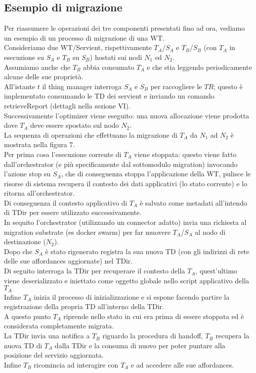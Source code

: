 \documentclass[11pt]{article}
\begin{document}
		\subsection{Esempio di migrazione}
		Per riassumere le operazioni dei tre componenti presentati fino ad ora, vediamo un esempio di un processo di migrazione di una WT. \\
		Consideriamo due WT/Servient, rispettivamente $T_A$/$S_A$ e $T_B$/$S_B$ (con $T_A$ in esecuzione su $S_A$ e $T_B$ su $S_B$) hostati sui nodi $N_1$ ed $N_2$. \\
		Assumiamo anche che $T_B$ abbia consumato $T_A$ e che stia leggendo periodicamente alcune delle sue proprietà. \\
		All'istante $t$ il thing manager interroga $S_A$ e $S_B$ per raccogliere le $TR$; questo è implementato consumando le TD dei servient e inviando un comando retrieveReport (dettagli nella sezione VI). \\
		Successivamente l'optimizer viene eseguito: una nuova allocazione viene prodotta dove $T_A$ deve essere spostato sul nodo $N_2$. \\
		La sequenza di operazioni che effettuano la migrazione di $T_A$ da $N_1$ ad $N_2$ è mostrata nella figura 7. \\
		Per prima cosa l'esecuzione corrente di $T_A$ viene stoppata: questo viene fatto dall'orchestrator (e più specificamente dal sottomodulo migration) invocando l'azione stop su $S_A$, che di conseguenza stoppa l'applicazione della WT, pulisce le risorse di sistema recupera il contesto dei dati applicativi (lo stato corrente) e lo ritorna all'orchestrator. \\
		Di conseguenza il contesto applicativo di $T_A$ è salvato come metadati all'intendo di TDir per essere utilizzato successivamente. \\
		In sequito l'orchestrator (utilizzando un connector adatto) invia una richiesta al migration substrate (es docker swarm) per far muovere $T_A$/$S_A$ al nodo di destinazione ($N_2$). \\
		Dopo che $S_A$ è stato rigenerato registra la sua nuova TD (con gli indirizzi di rete delle sue affordances aggiornate) nel TDir. \\
		Di seguito interroga la TDir per recuperare il contesto della $T_A$, quest'ultimo viene deserializzato e iniettato come oggetto globale nello script applicativo della $T_A$ \\
		Infine $T_A$ inizia il processo di inizializzazione e si espone facendo partire la registrazione della propria TD all'interno della TDir. \\
		A questo punto $T_A$ riprende nello stato in cui era prima di essere stoppata ed è considerata completamente migrata. \\
		La TDir invia una notifica a $T_B$ riguardo la procedura di handoff, $T_B$ recupera la nuova TD di $T_A$ dalla TDir e la consuma di nuovo per poter puntare alla posizione del servizio aggiornata. \\
		Infine $T_B$ ricomincia ad interagire con $T_A$ e ad accedere alle sue affordances. \\
		
\end{document}
